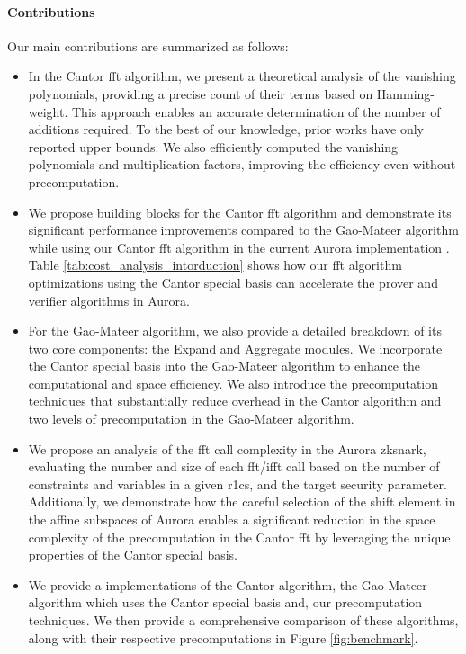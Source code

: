 \paragraph{Contributions} Our main contributions are summarized as follows:

\begin{itemize}
	\item In the Cantor \gls{fft} algorithm, we present a theoretical analysis of the vanishing polynomials, providing a precise count of their terms based on Hamming-weight. This approach enables an accurate determination of the number of additions required. To the best of our knowledge, prior works have only reported upper bounds. We also efficiently computed the vanishing polynomials and multiplication factors, improving the efficiency even without precomputation.
	
	\item We propose building blocks for the Cantor \gls{fft} algorithm and demonstrate its significant performance improvements compared to the Gao-Mateer algorithm while using our Cantor \gls{fft}  algorithm in the current Aurora implementation \cite{libiop}. Table \ref{tab:cost_analysis_intorduction} shows how our \gls{fft}  algorithm optimizations using the Cantor special basis can accelerate the prover and verifier algorithms in Aurora.
	
	\item  For the Gao-Mateer algorithm, we also provide a detailed breakdown of its two core components: the \textsf{Expand} and \textsf{Aggregate} modules. We incorporate the Cantor special basis into the Gao-Mateer algorithm to enhance the computational and space efficiency.
	We also introduce the precomputation techniques that substantially reduce overhead in the Cantor algorithm and two levels of precomputation in the Gao-Mateer algorithm.
	
	\item We propose an analysis of the \gls{fft} call complexity in the Aurora \gls{zksnark}, evaluating the number and size of each \gls{fft}/\gls{ifft} call based on the number of constraints and variables in a given \gls{r1cs}, and the target security parameter. Additionally, we demonstrate how the careful selection of the shift element in the affine subspaces of Aurora enables a significant reduction in the space complexity of the precomputation in the Cantor \gls{fft} by leveraging the unique properties of the Cantor special basis.
	
	\item We provide a \CC  implementations of the Cantor algorithm, the Gao-Mateer algorithm which uses the Cantor special basis and, our precomputation techniques. We then provide a comprehensive comparison of these algorithms, along with their respective precomputations in Figure \ref{fig:benchmark}. 
	

\end{itemize}

